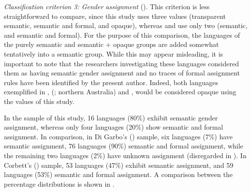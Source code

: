 \documentclass[output=collectionpaper]{langsci/langscibook}
\begin{document}
\textit{Classification criterion 3: Gender assignment} ().
This criterion is less straightforward to compare, since this study uses three values (transparent semantic, semantic and formal, and opaque), whereas \citet{DiGarbo2014} and \citet{Corbett2013b} use only two (semantic, and semantic and formal). For the purpose of this comparison, the languages of the purely semantic and semantic + opaque groups are added somewhat tentatively into a semantic group. While this may appear misleading, it is important to note that the researchers investigating these languages considered them as having semantic gender assignment and no traces of formal assignment rules have been identified by the present author. Indeed, both languages exemplified in \citet{Corbett2013b},  (; northern Australia) and , would be considered opaque using the values of this study.



In the sample of this study, 16 languages (80\%) exhibit semantic gender assignment, whereas only four languages (20\%) show semantic and formal assignment.  In comparison, in Di Garbo's (\citeyear[67]{DiGarbo2014}) sample, six languages (7\%) have semantic assignment, 76 languages (90\%) semantic and formal assignment, while the remaining two languages (2\%) have unknown assignment (disregarded in ). In Corbett's (\citeyear{Corbett2013b}) sample, 53 languages (47\%) exhibit semantic assignment, and 59 languages (53\%) semantic and formal assignment. A comparison between the percentage distributions is shown in .
\end{document}
